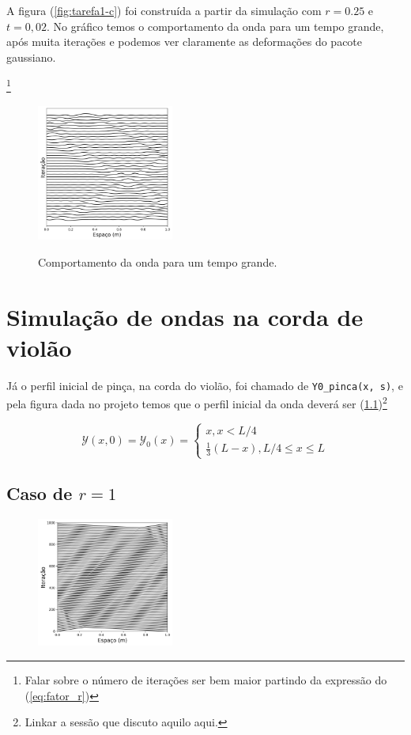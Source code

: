\documentclass[a4paper, 11pt]{article}
\begin{document}
A figura (\ref{fig:tarefa1-c}) foi construída a partir da simulação com \( r = 0.25 \) e \( t = 0,02
\). No gráfico temos o comportamento da onda para um tempo grande, após muita iterações e podemos
ver claramente as deformações do pacote gaussiano.

\footnote{Falar sobre o número de iterações ser bem maior partindo da expressão do (\ref{eq:fator_r})}
\begin{figure}[h!] 
    \centering
    \caption{Comportamento da onda para um tempo grande.}
    \includegraphics[width=0.4\textwidth]{graf-tarefa1-c}
    \label{fig:tarefa1-c2}
\end{figure}

\section{Simulação de ondas na corda de violão}

Já o perfil inicial de pinça, na corda do violão, foi chamado de \verb|Y0_pinca(x, s)|, e pela
figura dada no projeto temos que o perfil inicial da onda deverá ser (\ref{})\footnote{Linkar a sessão que discuto aquilo aqui.}

\begin{equation}
  \mathcal{Y}(x, 0) = \mathcal{Y}_0(x) = \begin{cases}
    x, x < L/4\\
    \frac{1}{3} \left( L - x \right), L/4 \leq x \leq L
  \end{cases}
  \label{eq:y_0_pinca}
\end{equation}



\subsection{Caso de \( r = 1 \) }

\begin{figure}[h!] 
    \centering
    \centering
    \includegraphics[width=0.4\textwidth]{graf-tarefa2-a}
    \caption{}
    \label{fig:subA}
\end{figure}
\end{document}
